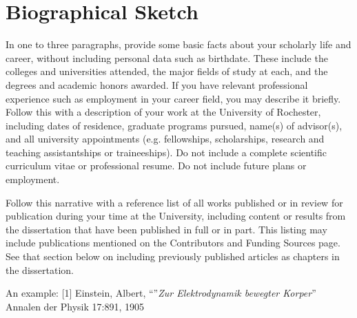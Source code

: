 \documentclass[\main/master.tex]{subfiles}
\begin{document}
\chapter*{Biographical Sketch}
\hspace{5 mm} In one to three paragraphs, provide some basic facts about your scholarly life and career, without including personal data such as birthdate. These include the colleges and universities attended, the major fields of study at each, and the degrees and academic honors awarded. If you have relevant professional experience such as employment in your career field, you may describe it briefly. Follow this with a description of your work at the University of Rochester, including dates of residence, graduate programs pursued, name(s) of advisor(s), and all university appointments (e.g. fellowships, scholarships, research and teaching assistantships or traineeships). Do not include a complete scientific curriculum vitae or professional resume. Do not include future plans or employment. \par
Follow this narrative with a reference list of all works published or in review for publication during your
time at the University, including content or results from the dissertation that have been published in full or in
part. This listing may include publications mentioned on the Contributors and Funding Sources page. See that
section below on including previously published articles as chapters in the dissertation. \par
An example:
[1] Einstein, Albert, ``''\emph{Zur Elektrodynamik bewegter Korper}'' Annalen der Physik 17:891, 1905 \newline
\end{document}
